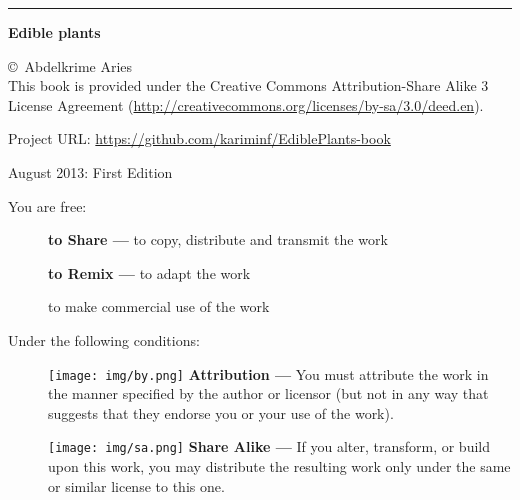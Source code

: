 %
%
%

\newpage
\hrule
{}
{}
\begin{flushright}
{\Huge \textbf{Edible plants}}
\end{flushright}

\vfill

  \copyright\ Abdelkrime Aries \\[0.5cm]
This book is provided under the Creative Commons Attribution-Share Alike 3 License Agreement (\url{http://creativecommons.org/licenses/by-sa/3.0/deed.en}).

\vspace{0.5cm}
\noindent
Project URL: \url{https://github.com/kariminf/EdiblePlants-book}

\vspace{1cm}
\noindent
August 2013: \hspace{2cm} First Edition

\vspace{1cm}
\noindent
You are free:
\begin{description}
\item[] \textbf{to Share —} to copy, distribute and transmit the work
\item[] \textbf{to Remix —} to adapt the work
\item[] to make commercial use of the work
\end{description}

\vspace{1cm}
\noindent
Under the following conditions:
\begin{description}
\item[] \texttt{[image: img/by.png]}
\textbf{Attribution —} You must attribute the work in the manner specified by the author or licensor (but not in any way that suggests that they endorse you or your use of the work).

\item[] \texttt{[image: img/sa.png]}
\textbf{Share Alike —} If you alter, transform, or build upon this work, you may distribute the resulting work only under the same or similar license to this one.
\end{description}

